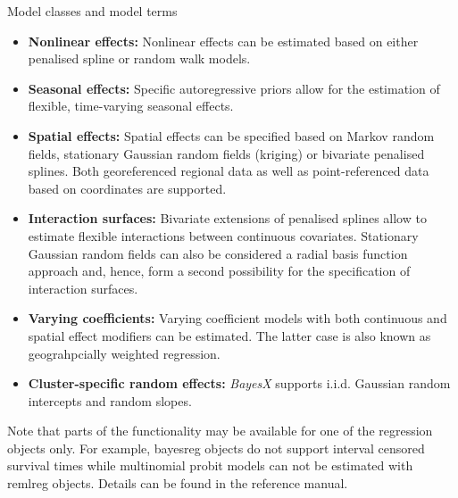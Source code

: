 \begin{stanza}{Model classes and model terms}
\begin{itemize}
\item{\bf\sffamily Nonlinear effects:} Nonlinear effects can be
estimated based on either penalised spline or random walk
models.

\item{\bf\sffamily Seasonal effects:} Specific autoregressive
priors allow for the estimation of flexible, time-varying seasonal
effects.

\item{\bf\sffamily Spatial effects:} Spatial effects can be
specified based on Markov random fields, stationary Gaussian
random fields (kriging) or bivariate penalised splines. Both
georeferenced regional data as well as point-referenced data based
on coordinates are supported.

\item{\bf\sffamily Interaction surfaces:} Bivariate extensions of
penalised splines allow to estimate flexible interactions between
continuous covariates. Stationary Gaussian random fields can also
be considered a radial basis function approach and, hence, form a
second possibility for the specification of interaction surfaces.

\item{\bf\sffamily Varying coefficients:} Varying coefficient
models with both continuous and spatial effect modifiers can be
estimated. The latter case is also known as geograhpcially
weighted regression.

\item{\bf\sffamily Cluster-specific random effects:} {\em BayesX}
supports i.i.d. Gaussian random intercepts and random slopes.
\end{itemize}

Note that parts of the functionality may be available for one of
the regression objects only. For example, bayesreg objects do not
support interval censored survival times while multinomial probit
models can not be estimated with remlreg objects. Details can be
found in the reference manual.
\end{stanza}

